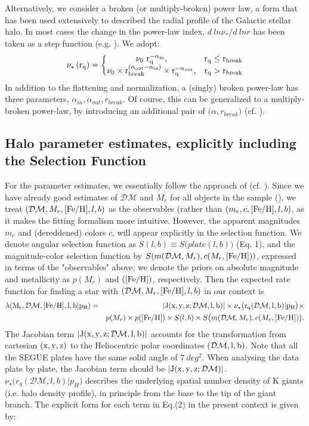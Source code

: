 \documentclass[12pt,preprint]{aastex}
\newcommand{\DM}{\mathcal{DM}}
\newcommand{\feh}{{\rm [Fe/H]}}
\begin{document}
Alternatively, we consider a broken (or multiply-broken) power law, a form that has been used extensively to described the radial profile of the Galactic stellar halo\citep{Saha1985,Sesar2011,Deason2011,Deason2014}. In most cases the change in the power-law index, 
$d~ln\nu_*/d~ln r$ has been taken as a step function (e.g. \citet{Deason2011}). We adopt:
\begin{equation}
\rm \nu_\star\left(r_q \right )= \left\{\begin{matrix} \rm \nu_0~r_q^{-\alpha_{in}}, & \rm r_q\leq r_{break} \\ \rm \nu_0\times r_{break}^{(\alpha_{out}-\alpha_{in})}\times r_q^{-\alpha_{out}},&\rm r_q>r_{break} \end{matrix}\right.
\end{equation}
In addition to the flattening and normalization, a (singly) broken power-law has three parameters,
$\alpha_{in}, \alpha_{out}, r_{break}$. Of course, this can be generalized to a multiply-broken
power-law, by introducing an additional pair of $\bigl ( \alpha, r_{break} \bigr )$ (cf. \citet{Deason2014}).

\subsection{Halo parameter estimates, explicitly including the Selection Function}

For the parameter estimates, we essentially follow the approach of \citet{Bovy2012} (cf.  \citet{Rix2013}). 
Since we have already good estimates of $\DM$ and $M_r$ for all objects in the sample (\citet{Xue2014}), we treat $(\DM,M_r,\feh,l,b)$ as the observables (rather than $(m_r,c,\feh,l,b)$, as it makes the fitting formalism more intuitive. However, the apparent magnitudes $m_r$ and (dereddened) colors $c$, will appear explicitly in the selection function.  We denote angular selection function as $S(l,b)\equiv S\bigl ( plate (l,b)\bigr )$ (Eq. 1), and the magnitude-color selection function by $S(m(\DM,M_r),c(M_r,\feh))$, expressed in terms of the "observables" above; we denote the priors on absolute magnitude and metallicity as
$p(M_r)$ and $(\feh)$, respectively. Then the expected rate function for finding a star with 
$(\DM,M_r,\feh,l,b)$ in our context is
\begin{eqnarray}
\rm \lambda(M_r,\DM,\feh,l,b|p_H)&=&\rm |J(x,y,z;\DM,l,b)|\times \nu_\star\bigl (r_q(\DM,l,b)|p_H\bigr )\times \\
&&p(M_r)\times p(\feh) \times S(l,b) \times S\bigl ( m(\DM,M_r),c(M_r,\feh)\bigr )\nonumber.
\end{eqnarray}
The Jacobian term $\rm |J(x,y,z;\DM,l,b)|$ accounts for the transformation from cartesian $\rm (x,y,z)$ to the Heliocentric polar coordinates $\rm (\DM, l, b)$. Note that all the SEGUE plates have the same solid angle of $7~deg^2$. When analysing the data plate by plate, the Jacobian term should be $\rm |J(x,y,z;\DM)|$. $\nu_\star\bigl (r_q(\DM,l,b)|p_H\bigr )$ describes the underlying spatial number density of K giants (i.e. halo density profile), in principle from the base to the tip of the giant branch.
 The explicit form for each term in Eq.(2) in the present context is given by:
 
\end{document}
